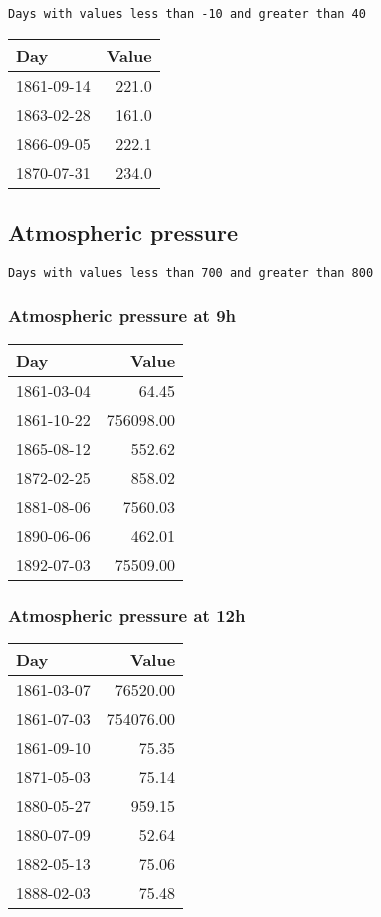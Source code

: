 \documentclass[]{article}
\begin{document}
\begin{verbatim}
Days with values less than -10 and greater than 40
\end{verbatim}

\begin{longtable}[]{@{}lr@{}}
\toprule
Day & Value\tabularnewline
\midrule
\endhead
1861-09-14 & 221.0\tabularnewline
1863-02-28 & 161.0\tabularnewline
1866-09-05 & 222.1\tabularnewline
1870-07-31 & 234.0\tabularnewline
\bottomrule
\end{longtable}

\subsection{Atmospheric pressure}\label{atmospheric-pressure-1}

\begin{verbatim}
Days with values less than 700 and greater than 800
\end{verbatim}

\subsubsection{Atmospheric pressure at
9h}\label{atmospheric-pressure-at-9h-1}

\begin{longtable}[]{@{}lr@{}}
\toprule
Day & Value\tabularnewline
\midrule
\endhead
1861-03-04 & 64.45\tabularnewline
1861-10-22 & 756098.00\tabularnewline
1865-08-12 & 552.62\tabularnewline
1872-02-25 & 858.02\tabularnewline
1881-08-06 & 7560.03\tabularnewline
1890-06-06 & 462.01\tabularnewline
1892-07-03 & 75509.00\tabularnewline
\bottomrule
\end{longtable}

\subsubsection{Atmospheric pressure at
12h}\label{atmospheric-pressure-at-12h-1}

\begin{longtable}[]{@{}lr@{}}
\toprule
Day & Value\tabularnewline
\midrule
\endhead
1861-03-07 & 76520.00\tabularnewline
1861-07-03 & 754076.00\tabularnewline
1861-09-10 & 75.35\tabularnewline
1871-05-03 & 75.14\tabularnewline
1880-05-27 & 959.15\tabularnewline
1880-07-09 & 52.64\tabularnewline
1882-05-13 & 75.06\tabularnewline
1888-02-03 & 75.48\tabularnewline
\bottomrule
\end{longtable}
\end{document}
